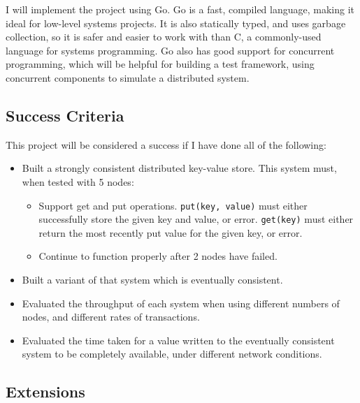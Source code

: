 I will implement the project using Go. Go is a fast, compiled language, making it ideal for low-level systems projects. It is also statically typed, and uses garbage collection, so it is safer and easier to work with than C, a commonly-used language for systems programming. Go also has good support for concurrent programming, which will be helpful for building a test framework, using concurrent components to simulate a distributed system.

\subsection*{Success Criteria}

This project will be considered a success if I have done all of the following:

\begin{itemize}
  \item
  Built a strongly consistent distributed key-value store. This system must, when tested with 5 nodes:

  \begin{itemize}
    \item
    Support get and put operations. \verb|put(key, value)| must either successfully store the given key and value, or error. \verb|get(key)| must either return the most recently put value for the given key, or error.

    \item
    Continue to function properly after 2 nodes have failed.

  \end{itemize}

  \item
  Built a variant of that system which is eventually consistent.

  \item
  Evaluated the throughput of each system when using different numbers of nodes, and different rates of transactions.

  \item
  Evaluated the time taken for a value written to the eventually consistent system to be completely available, under different network conditions.

\end{itemize}

\subsection*{Extensions}

